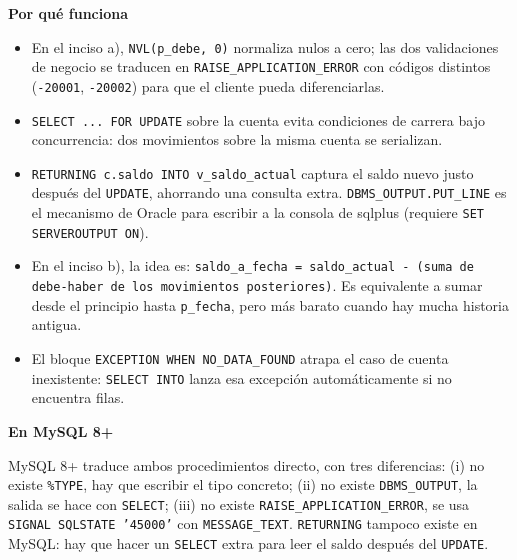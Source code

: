 \documentclass[11pt,a4paper]{article}
\newcommand{\itemcabecera}[1]{\noindent\textbf{#1}\par\medskip}
\newcommand{\bloquePorque}{\itemcabecera{Por qu\'e funciona}}
\newcommand{\bloqueMySQL}{\itemcabecera{En MySQL 8+}}
\begin{document}
\bloquePorque

\begin{itemize}
    \item En el inciso a), \texttt{NVL(p\_debe, 0)} normaliza nulos a cero; las dos validaciones de negocio se traducen en \texttt{RAISE\_APPLICATION\_ERROR} con códigos distintos (\texttt{-20001}, \texttt{-20002}) para que el cliente pueda diferenciarlas.
    \item \texttt{SELECT ... FOR UPDATE} sobre la cuenta evita condiciones de carrera bajo concurrencia: dos movimientos sobre la misma cuenta se serializan.
    \item \texttt{RETURNING c.saldo INTO v\_saldo\_actual} captura el saldo nuevo justo después del \texttt{UPDATE}, ahorrando una consulta extra. \texttt{DBMS\_OUTPUT.PUT\_LINE} es el mecanismo de Oracle para escribir a la consola de sqlplus (requiere \texttt{SET SERVEROUTPUT ON}).
    \item En el inciso b), la idea es: \texttt{saldo\_a\_fecha = saldo\_actual - (suma de debe-haber de los movimientos posteriores)}. Es equivalente a sumar desde el principio hasta \texttt{p\_fecha}, pero más barato cuando hay mucha historia antigua.
    \item El bloque \texttt{EXCEPTION WHEN NO\_DATA\_FOUND} atrapa el caso de cuenta inexistente: \texttt{SELECT INTO} lanza esa excepción automáticamente si no encuentra filas.
\end{itemize}

\bloqueMySQL

MySQL 8+ traduce ambos procedimientos directo, con tres diferencias: (i) no existe \texttt{\%TYPE}, hay que escribir el tipo concreto; (ii) no existe \texttt{DBMS\_OUTPUT}, la salida se hace con \texttt{SELECT}; (iii) no existe \texttt{RAISE\_APPLICATION\_ERROR}, se usa \texttt{SIGNAL SQLSTATE '45000'} con \texttt{MESSAGE\_TEXT}. \texttt{RETURNING} tampoco existe en MySQL: hay que hacer un \texttt{SELECT} extra para leer el saldo después del \texttt{UPDATE}.
\end{document}
